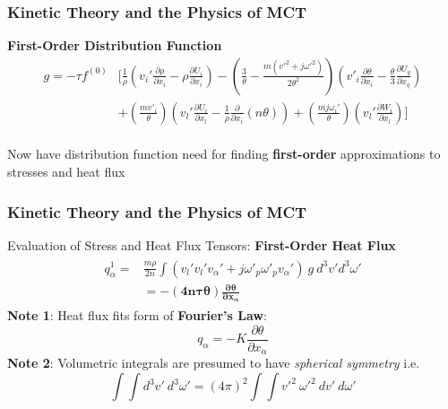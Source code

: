 \documentclass{beamer}
\begin{document}
\begin{frame}
 \frametitle{Kinetic Theory and the Physics of MCT}
 \Large \textbf{First-Order Distribution Function}
 \normalsize
 \begin{equation*}
\label{gfull}
\begin{split}
g=-\tau f^{(0)}&[\frac{1}{\rho}(v_i'\frac{\partial \rho}{\partial x_i} -\rho 
\frac{\partial U_i}{\partial x_i}) 
- (\frac{3}{\theta}- 
\frac{m(v'^2+j\omega'^2)}{2\theta^2})(v'_{i}\frac{\partial \theta}{\partial 
x_i} - 
\frac{\theta}{3} \frac{\partial U_q}{\partial x_q}) \\ &+  
(\frac{mv'_i}{\theta})(v_l'\frac{\partial U_i}{\partial x_l} 
-\frac{1}{\rho}\frac{\partial}{\partial x_i}(n\theta)) + 
(\frac{mj\omega_i'}{\theta})(v_l'\frac{\partial W_i}{\partial x_l})]
\end{split}
\end{equation*}
\\ 
\pause
\Large
Now have distribution function need for finding \textbf{first-order} 
approximations to stresses and heat flux
\end{frame}

\begin{frame}
\frametitle{Kinetic Theory and the Physics of MCT}
Evaluation of Stress and Heat Flux Tensors: \textbf{First-Order Heat Flux}
\begin{align*}
 \begin{split}
 \label{heatMCTsurface}
 q^1_{\alpha} = &\frac{m\rho}{2n}\int (v_l'v_l'v_\alpha' + 
j\omega'_p\omega'_pv_\alpha') \ g \ 
d^3v'd^3\omega'  \\
&= \bm{-(4n\tau\theta)\frac{\partial \theta}{\partial x_\alpha}} 
\end{split}
\end{align*}
\pause
\textbf{Note 1}: Heat flux fits form of \textbf{Fourier's Law}:
\begin{equation*}
 q_{\alpha} = -K\frac{\partial \theta}{\partial x_{\alpha}}
\end{equation*}
\pause
\textbf{Note 2}: Volumetric integrals are presumed to have \textit{spherical 
symmetry} i.e. $$\int \int d^3 v' \ d^3\omega' = (4\pi)^2 \int \int v'^2 \ 
\omega '^2 \ dv' \ d\omega'$$
\end{frame}
\end{document}
